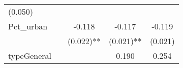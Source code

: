 \documentclass[12pt,twoside]{reedthesis}
\begin{document}
\begin{longtable}[]{@{}lcccc@{}}
\begin{minipage}[t]{0.11\columnwidth}
  (0.050)\strut
  \end{minipage}\tabularnewline
  \begin{minipage}[t]{0.23\columnwidth}\raggedright\strut
  Pct\_urban\strut
  \end{minipage} & \begin{minipage}[t]{0.14\columnwidth}\centering\strut
  \strut
  \end{minipage} & \begin{minipage}[t]{0.18\columnwidth}\centering\strut
  -0.118\strut
  \end{minipage} & \begin{minipage}[t]{0.20\columnwidth}\centering\strut
  -0.117\strut
  \end{minipage} & \begin{minipage}[t]{0.11\columnwidth}\centering\strut
  -0.119\strut
  \end{minipage}\tabularnewline
  \begin{minipage}[t]{0.23\columnwidth}\raggedright\strut
  \strut
  \end{minipage} & \begin{minipage}[t]{0.14\columnwidth}\centering\strut
  \strut
  \end{minipage} & \begin{minipage}[t]{0.18\columnwidth}\centering\strut
  (0.022)**\strut
  \end{minipage} & \begin{minipage}[t]{0.20\columnwidth}\centering\strut
  (0.021)**\strut
  \end{minipage} & \begin{minipage}[t]{0.11\columnwidth}\centering\strut
  (0.021)\strut
  \end{minipage}\tabularnewline
  \begin{minipage}[t]{0.23\columnwidth}\raggedright\strut
  typeGeneral\strut
  \end{minipage} & \begin{minipage}[t]{0.14\columnwidth}\centering\strut
  \strut
  \end{minipage} & \begin{minipage}[t]{0.18\columnwidth}\centering\strut
  \strut
  \end{minipage} & \begin{minipage}[t]{0.20\columnwidth}\centering\strut
  0.190\strut
  \end{minipage} & \begin{minipage}[t]{0.11\columnwidth}\centering\strut
  0.254\strut
  \end{minipage}\tabularnewline

\end{longtable}
\end{document}

